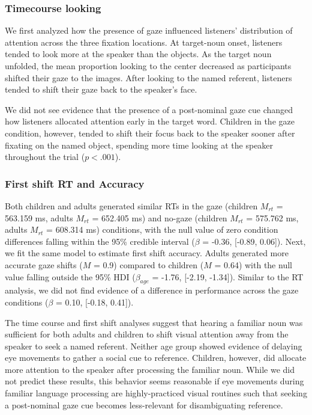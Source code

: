 \documentclass[10pt, letterpaper]{article}
\begin{document}
\hypertarget{timecourse-looking}{%
\subsubsection{Timecourse looking}\label{timecourse-looking}}

We first analyzed how the presence of gaze influenced listeners'
distribution of attention across the three fixation locations. At
target-noun onset, listeners tended to look more at the speaker than the
objects. As the target noun unfolded, the mean proportion looking to the
center decreased as participants shifted their gaze to the images. After
looking to the named referent, listeners tended to shift their gaze back
to the speaker's face.

We did not see evidence that the presence of a post-nominal gaze cue
changed how listeners allocated attention early in the target word.
Children in the gaze condition, however, tended to shift their focus
back to the speaker sooner after fixating on the named object, spending
more time looking at the speaker throughout the trial (\(p < .001\)).

\hypertarget{first-shift-rt-and-accuracy}{%
\subsubsection{First shift RT and
Accuracy}\label{first-shift-rt-and-accuracy}}

Both children and adults generated similar RTs in the gaze (children
\(M_{rt}\) = 563.159 ms, adults \(M_{rt}\) = 652.405 ms) and no-gaze
(children \(M_{rt}\) = 575.762 ms, adults \(M_{rt}\) = 608.314 ms)
conditions, with the null value of zero condition differences falling
within the 95\% credible interval (\(\beta\) = -0.36, {[}-0.89,
0.06{]}). Next, we fit the same model to estimate first shift accuracy.
Adults generated more accurate gaze shifts (\(M\) = 0.9) compared to
children (\(M\) = 0.64) with the null value falling outside the 95\% HDI
(\(\beta_{age}\) = -1.76, {[}-2.19, -1.34{]}). Similar to the RT
analysis, we did not find evidence of a difference in performance across
the gaze conditions (\(\beta\) = 0.10, {[}-0.18, 0.41{]}).

The time course and first shift analyses suggest that hearing a familiar
noun was sufficient for both adults and children to shift visual
attention away from the speaker to seek a named referent. Neither age
group showed evidence of delaying eye movements to gather a social cue
to reference. Children, however, did allocate more attention to the
speaker after processing the familiar noun. While we did not predict
these results, this behavior seems reasonable if eye movements during
familiar language processing are highly-practiced visual routines such
that seeking a post-nominal gaze cue becomes less-relevant for
disambiguating reference.
\end{document}
